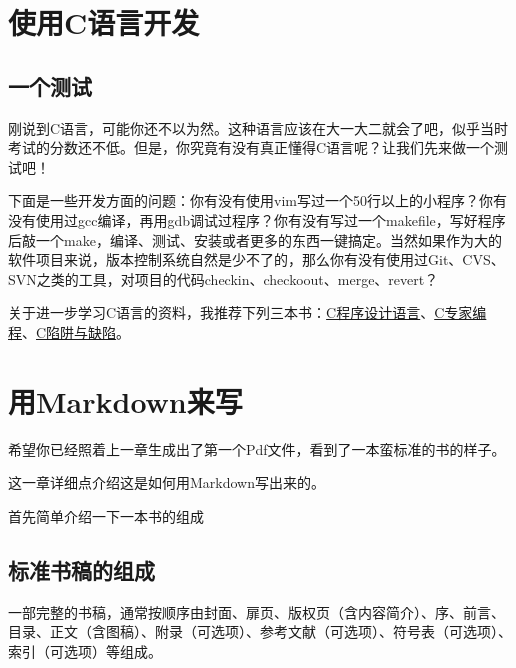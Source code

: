 \documentclass[a4paper]{book}
\renewcommand{\headrulewidth}{0pt}
\newcommand{\chap}[1]{\newpage\thispagestyle{empty}\chapter{#1}\label{chap:\thechapter}}
\begin{document}
\pagestyle{fancy}

\mainmatter
\chap{使用C语言开发}

\section{一个测试}

刚说到C语言，可能你还不以为然。这种语言应该在大一大二就会了吧，似乎当时考试的分数还不低。但是，你究竟有没有真正懂得C语言呢？让我们先来做一个测试吧！

下面是一些开发方面的问题：你有没有使用vim写过一个50行以上的小程序？你有没有使用过gcc编译，再用gdb调试过程序？你有没有写过一个makefile，写好程序后敲一个make，编译、测试、安装或者更多的东西一键搞定。当然如果作为大的软件项目来说，版本控制系统自然是少不了的，那么你有没有使用过Git、CVS、SVN之类的工具，对项目的代码checkin、checkoout、merge、revert？

关于进一步学习C语言的资料，我推荐下列三本书：\href{http://www.amazon.cn/C\%E7\%A8\%8B\%E5\%BA\%8F\%E8\%AE\%BE\%E8\%AE\%A1\%E8\%AF\%AD\%E8\%A8\%80-\%E5\%85\%8B\%E5\%B0\%BC\%E6\%B1\%89/dp/B0011C9OMG/ref=sr\_1\_1?ie=UTF8\&qid=1334586907\&sr=8-1}{C程序设计语言}、\href{http://www.amazon.cn/C\%E5\%92\%8CC-\%E7\%BB\%8F\%E5\%85\%B8\%E8\%91\%97\%E4\%BD\%9C\%E2\%80\%A2C\%E4\%B8\%93\%E5\%AE\%B6\%E7\%BC\%96\%E7\%A8\%8BExpert-C-Programming-Deep-C-Secrets-Peter-Van-Der-Linden/dp/B0012NIW9K/ref=sr\_1\_1?s=books\&ie=UTF8\&qid=1334587029\&sr=1-1}{C专家编程}、\href{http://www.amazon.cn/C\%E5\%92\%8CC-\%E7\%BB\%8F\%E5\%85\%B8\%E8\%91\%97\%E4\%BD\%9C\%E2\%80\%A2C\%E9\%99\%B7\%E9\%98\%B1\%E4\%B8\%8E\%E7\%BC\%BA\%E9\%99\%B7-Andrew-Koenig/dp/B0012NIW72/ref=pd\_sim\_b\_1}{C陷阱与缺陷}。

\chap{用Markdown来写}

希望你已经照着上一章生成出了第一个Pdf文件，看到了一本蛮标准的书的样子。

这一章详细点介绍这是如何用Markdown写出来的。

首先简单介绍一下一本书的组成

\section{标准书稿的组成}

一部完整的书稿，通常按顺序由封面、扉页、版权页（含内容简介）、序、前言、目录、正文（含图稿）、附录（可选项）、参考文献（可选项）、符号表（可选项）、索引（可选项）等组成。
\end{document}
